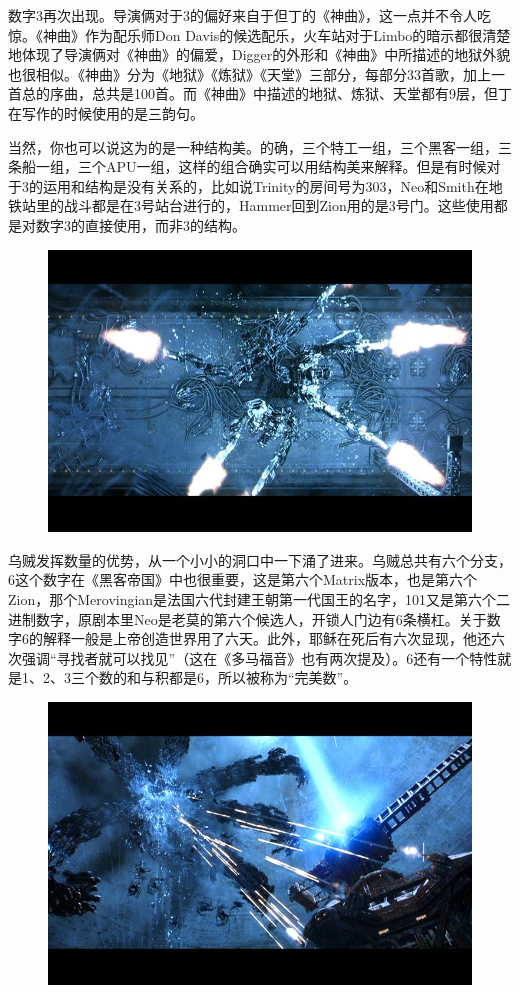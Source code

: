 \documentclass[UTF8]{ctexart}
\begin{document}
数字3再次出现。导演俩对于3的偏好来自于但丁的《神曲》，这一点并不令人吃惊。《神曲》作为配乐师Don Davis的候选配乐，火车站对于Limbo的暗示都很清楚地体现了导演俩对《神曲》的偏爱，Digger的外形和《神曲》中所描述的地狱外貌也很相似。《神曲》分为《地狱》《炼狱》《天堂》三部分，每部分33首歌，加上一首总的序曲，总共是100首。而《神曲》中描述的地狱、炼狱、天堂都有9层，但丁在写作的时候使用的是三韵句。

当然，你也可以说这为的是一种结构美。的确，三个特工一组，三个黑客一组，三条船一组，三个APU一组，这样的组合确实可以用结构美来解释。但是有时候对于3的运用和结构是没有关系的，比如说Trinity的房间号为303，Neo和Smith在地铁站里的战斗都是在3号站台进行的，Hammer回到Zion用的是3号门。这些使用都是对数字3的直接使用，而非3的结构。

\begin{figure}[htb]
\centering
\includegraphics[width=0.5\linewidth]{fig/0874fcfae17645deb48f31ee.jpg}
\end{figure}

乌贼发挥数量的优势，从一个小小的洞口中一下涌了进来。乌贼总共有六个分支，6这个数字在《黑客帝国》中也很重要，这是第六个Matrix版本，也是第六个Zion，那个Merovingian是法国六代封建王朝第一代国王的名字，101又是第六个二进制数字，原剧本里Neo是老莫的第六个候选人，开锁人门边有6条横杠。关于数字6的解释一般是上帝创造世界用了六天。此外，耶稣在死后有六次显现，他还六次强调“寻找者就可以找见”（这在《多马福音》也有两次提及）。6还有一个特性就是1、2、3三个数的和与积都是6，所以被称为“完美数”。

\begin{figure}[htb]
\centering
\includegraphics[width=0.5\linewidth]{fig/2fc3cc11f0d8ff10b9127bd2.jpg}
\end{figure}
\end{document}
